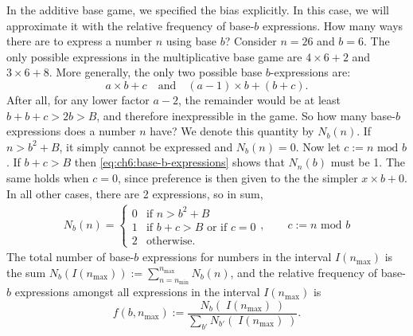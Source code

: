 \documentclass{../src/bcthesispart}
\begin{document}
In the additive base game, we specified the bias explicitly.
In this case, we will approximate it with the relative frequency of base-$b$ expressions.
How many ways there are to express a number $n$ using base $b$?
Consider $n=26$ and $b=6$.
The only possible expressions in the multiplicative base game are $4 \times 6 +2$ and $3\times 6 + 8$. 
More generally, the only two possible base $b$-expressions are:
\begin{equation}
	\label{eq:ch6:base-b-expressions}
	a\times b + c 
	\quad \text{and} \quad 
	(a-1) \times b + (b+c).
\end{equation}
After all, for any lower factor $a-2$, the remainder would be at least $b+b+c > 2b > B$, and therefore inexpressible in the game.
So how many base-$b$ expressions does a number $n$ have? 
We denote this quantity by $N_b(n)$.
If $n > b^2+B$, it simply cannot be expressed and $N_b(n) = 0$.
Now let $c := n \text{ mod } b$. 
If $b+c > B$ then \eqref{eq:ch6:base-b-expressions} shows that $N_n(b)$ must be 1.
The same holds when $c = 0$, since preference is then given to the the simpler $x\times b + 0$.
In all other cases, there are 2 expressions, so in sum,
\begin{align}
	N_b(n) = \begin{cases}
		0 	&\text{if $n> b^2 + B$}
		\\
		1	&\text{if $b+c > B$ or if $c=0$}
		\\
		2	&\text{otherwise}.
	\end{cases},
	\qquad c := n \text{ mod } b
\end{align}
The total number of base-$b$ expressions for numbers in the interval $I(n_{\text{max}})$ is the sum $N_b(I(n_{\text{max}})) := \sum_{n=n_{\text{min}}}^{n_{\text{max}}} N_b(n)$,
and the relative frequency of base-$b$ expressions amongst all expressions in the interval $I(n_{\text{max}})$ is
\begin{equation}
	f(b, n_{\text{max}}) := \frac{N_b(\; I(n_{\text{max}}) \;)}%
			{\sum_{b'} N_{b'}(\; I(n_{\text{max}}) \;)}.
\end{equation}
\end{document}
